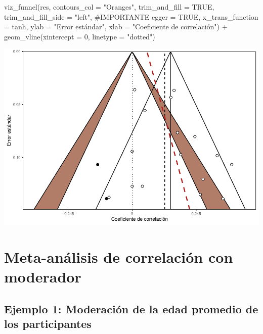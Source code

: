 \documentclass[
  bookmarksnumbered]{article}
\newenvironment{Shaded}{\begin{snugshade}}{\end{snugshade}}
\newcommand{\AttributeTok}[1]{\textcolor[rgb]{0.00,0.34,0.68}{#1}}
\newcommand{\CommentTok}[1]{\textcolor[rgb]{0.54,0.53,0.53}{#1}}
\newcommand{\ConstantTok}[1]{\textcolor[rgb]{0.67,0.33,0.00}{#1}}
\newcommand{\DecValTok}[1]{\textcolor[rgb]{0.69,0.50,0.00}{#1}}
\newcommand{\FunctionTok}[1]{\textcolor[rgb]{0.39,0.29,0.61}{#1}}
\newcommand{\NormalTok}[1]{\textcolor[rgb]{0.12,0.11,0.11}{#1}}
\newcommand{\SpecialCharTok}[1]{\textcolor[rgb]{0.24,0.68,0.91}{#1}}
\newcommand{\StringTok}[1]{\textcolor[rgb]{0.75,0.01,0.01}{#1}}
\begin{document}
\begin{Shaded}
\begin{Highlighting}[]
\FunctionTok{viz\_funnel}\NormalTok{(res, }
           \AttributeTok{contours\_col =} \StringTok{"Oranges"}\NormalTok{,}
           \AttributeTok{trim\_and\_fill =} \ConstantTok{TRUE}\NormalTok{, }
           \AttributeTok{trim\_and\_fill\_side =} \StringTok{"left"}\NormalTok{, }\CommentTok{\#IMPORTANTE}
           \AttributeTok{egger =} \ConstantTok{TRUE}\NormalTok{,}
           \AttributeTok{x\_trans\_function =}\NormalTok{ tanh,}
           \AttributeTok{ylab =} \StringTok{"Error estándar"}\NormalTok{,}
           \AttributeTok{xlab =} \StringTok{"Coeficiente de correlación"}\NormalTok{) }\SpecialCharTok{+}
  \FunctionTok{geom\_vline}\NormalTok{(}\AttributeTok{xintercept =} \DecValTok{0}\NormalTok{, }\AttributeTok{linetype =} \StringTok{"dotted"}\NormalTok{)}
\end{Highlighting}
\end{Shaded}

\includegraphics{Meta-analysis_files/figure-latex/unnamed-chunk-21-1.pdf}

\hypertarget{meta-anuxe1lisis-de-correlaciuxf3n-con-moderador}{%
\section{Meta-análisis de correlación con moderador}\label{meta-anuxe1lisis-de-correlaciuxf3n-con-moderador}}

\hypertarget{ejemplo-1-moderaciuxf3n-de-la-edad-promedio-de-los-participantes}{%
\subsection{Ejemplo 1: Moderación de la edad promedio de los participantes}\label{ejemplo-1-moderaciuxf3n-de-la-edad-promedio-de-los-participantes}}
\end{document}
